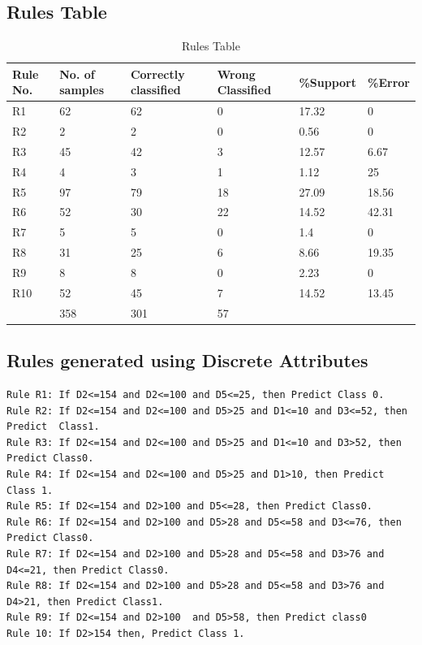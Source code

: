 \documentclass[a4paper,14pt,onecolumn]{article}
\begin{document}
\newpage
\subsection{Rules Table}
\begin{table}[hbp]
 \begin{center}
    \begin{tabular}{ | l | l | l | l | l | p{1cm}| }
    \hline
     Rule No. & No. of samples &	Correctly classified &	Wrong Classified &  \%Support & \%Error \\ \hline
R1	& 62	& 62	& 0	& 17.32	 & 0 \\ \hline
R2	& 2	& 2	& 0	& 0.56 &	0 \\ \hline
R3	& 45	 & 42	& 3	& 12.57 	& 6.67 \\ \hline
R4	& 4	& 3	& 1 & 1.12	& 25 \\ \hline
R5	& 97	& 79	& 18	& 27.09	 & 18.56 \\ \hline
R6	& 52	& 30	& 22	& 14.52	 & 42.31 \\ \hline
R7	& 5 &	5	& 0	& 1.4	& 0 \\ \hline
R8	& 31	& 25	& 6	& 8.66	& 19.35 \\ \hline
R9	& 8	& 8	& 0	& 2.23	& 0 \\ \hline
R10	& 52	& 45	& 7	& 14.52 	& 13.45 \\ \hline
\, & 358 &  301 & 57 &  \, & \,\\ \hline
       \end{tabular}
   \caption{Rules Table}
\end{center}
\end{table} 

\subsection{Rules generated using Discrete Attributes}
\begin{verbatim}
Rule R1: If D2<=154 and D2<=100 and D5<=25, then Predict Class 0.
Rule R2: If D2<=154 and D2<=100 and D5>25 and D1<=10 and D3<=52, then Predict  Class1.
Rule R3: If D2<=154 and D2<=100 and D5>25 and D1<=10 and D3>52, then Predict Class0.
Rule R4: If D2<=154 and D2<=100 and D5>25 and D1>10, then Predict Class 1.
Rule R5: If D2<=154 and D2>100 and D5<=28, then Predict Class0.
Rule R6: If D2<=154 and D2>100 and D5>28 and D5<=58 and D3<=76, then Predict Class0.
Rule R7: If D2<=154 and D2>100 and D5>28 and D5<=58 and D3>76 and D4<=21, then Predict Class0.
Rule R8: If D2<=154 and D2>100 and D5>28 and D5<=58 and D3>76 and D4>21, then Predict Class1.
Rule R9: If D2<=154 and D2>100  and D5>58, then Predict class0
Rule 10: If D2>154 then, Predict Class 1.
\end{verbatim}
\end{document}
